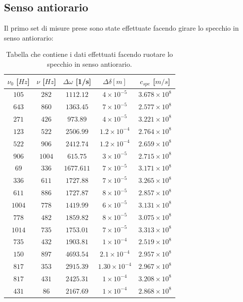 \subsection{Senso antiorario}
Il primo set di misure prese sono state effettuate facendo girare lo specchio in senso antiorario:
\begin{table}[ht]
    \centering
    \begin{tabular}{|c|c|c|c|c|}
    \hline
     $\nu_0$ [$Hz$] & $\nu$ [$Hz$] & $\Delta \omega$ [1/s] & $\Delta\delta[m]$ & $c_{spe}$ [$m/s$] \\
    \hline
    $105$ & $282$ & $1112.12$ & $4\times10^{-5}$ & $3.678\times10^8$ \\
    \hline
    $643$ & $860$ & $1363.45$ & $7\times10^{-5}$ & $2.577\times10^8$ \\
    \hline
    $271$ & $426$ & $973.89$ & $4\times10^{-5}$ & $3.221\times10^8$ \\
    \hline
    $123$ & $522$ & $2506.99$ & $1.2\times10^{-4}$ & $2.764\times10^8$ \\
    \hline
    $522$ & $906$ & $2412.74$ & $1.2\times10^{-4}$ & $2.659\times10^8$ \\
    \hline
    $906$ & $1004$ & $615.75$ & $3\times10^{-5}$ & $2.715\times10^8$ \\
    \hline
    $69$ & $336$ & $1677.611$ & $7\times10^{-5}$ & $3.171\times10^8$ \\
    \hline
    $336$ & $611$ & $1727.88$ & $7\times10^{-5}$ & $3.265\times10^8$ \\
    \hline
    $611$ & $886$ & $1727.87$ & $8\times10^{-5}$ & $2.857\times10^8$ \\
    \hline
    $1004$ & $778$ & $1419.99$ & $6\times10^{-5}$ & $3.131\times10^8$ \\
    \hline
    $778$ & $482$ & $1859.82$ & $8\times10^{-5}$ & $3.075\times10^8$ \\
    \hline
    $1014$ & $735$ & $1753.01$ & $7\times10^{-5}$ & $3.313\times10^8$ \\
    \hline
    $735$ & $432$ & $1903.81$ & $1\times10^{-4}$ & $2.519\times10^8$ \\
    \hline
    $150$ & $897$ & $4693.54$ & $2.1\times10^{-4}$ & $2.957\times10^8$ \\
    \hline
    $817$ & $353$ & $2915.39$ & $1.30\times10^{-4}$ & $2.967\times10^8$ \\
    \hline
    $817$ & $431$ & $2425.31$ & $1\times10^{-4}$ & $3.208\times10^8$ \\
    \hline
    $431$ & $86$ & $2167.69$ & $1\times10^{-4}$ & $2.868\times10^8$ \\
    \hline
    \end{tabular}
    \caption{Tabella che contiene i dati effettuati facendo ruotare lo specchio in senso antiorario.}
    \label{antiorario}
\end{table}
